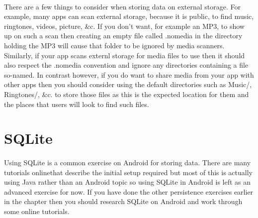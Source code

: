 \paragraph{} There are a few things to consider when storing data on external storage. For example, many apps can scan external storage, because it is public, to find music, ringtones, videos, picture, \&c. If you don't want, for example an MP3, to show up on such a scan then creating an empty file called .nomedia in the directory holding the MP3 will cause that folder to be ignored by media scanners. Similarly, if your app scans externl storage for media files to use then it should also respect the .nomedia convention and ignore any directories containing a file so-named. In contrast however, if you do want to share media from your app with other apps then you should consider using the default directories such as Music/, Ringtones/, \&c. to store those files as this is the expected location for them and the places that users will look to find such files.

\section{SQLite}
\paragraph{} Using SQLite is a common exercise on Android for storing data. There are many tutorials onlinethat describe the initial setup required but most of this is actually using Java rather than an Android topic so using SQLite in Android is left as an advanced exercise for now. If you have done the other persistence exercises earlier in the chapter then you should research SQLite on Android and work through some online tutorials.

